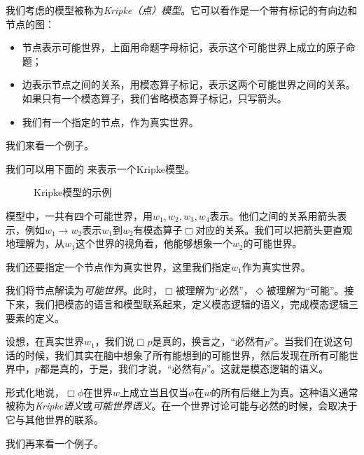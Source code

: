 我们考虑的模型被称为\emph{Kripke（点）模型}。它可以看作是一个带有标记的有向边和节点的图：
\begin{itemize}
\item 节点表示可能世界，上面用命题字母标记，表示这个可能世界上成立的原子命题；
\item 边表示节点之间的关系，用模态算子标记，表示这两个可能世界之间的关系。如果只有一个模态算子，我们省略模态算子标记，只写箭头。
\item 我们有一个指定的节点，作为真实世界。
\end{itemize}

我们来看一个例子。

\begin{example}
我们可以用下面的 来表示一个Kripke模型。

\begin{figure}[ht]
\centering

\caption{Kripke模型的示例}\label{fig:kripke-model-basic}
\end{figure}

模型中，一共有四个可能世界，用$w_1,w_2,w_3,w_4$表示。他们之间的关系用箭头表示，例如$w_1\to w_2$表示$w_1$到$w_2$有模态算子$\Box$对应的关系。我们可以把箭头更直观地理解为，从$w_1$这个世界的视角看，他能够想象一个$w_2$的可能世界。

我们还要指定一个节点作为真实世界，这里我们指定$w_1$作为真实世界。
\end{example}

我们将节点解读为\emph{可能世界}。此时，$\Box$被理解为“必然”，$\Diamond$被理解为“可能”。接下来，我们把模态的语言和模型联系起来，定义模态逻辑的语义，完成模态逻辑三要素的定义。

设想，在真实世界$w_1$，我们说$\Box p$是真的，换言之，“必然有$p$”。当我们在说这句话的时候，我们其实在脑中想象了所有能想到的可能世界，然后发现在所有可能世界中，$p$都是真的，于是，我们才说，“必然有$p$”。这就是模态逻辑的语义。

形式化地说，$\Box\phi$在世界$w$上成立当且仅当$\phi$在$w$的所有后继上为真。这种语义通常被称为\emph{Kripke语义}或\emph{可能世界语义}。在一个世界讨论可能与必然的时候，会取决于它与其他世界的联系。

我们再来看一个例子。

